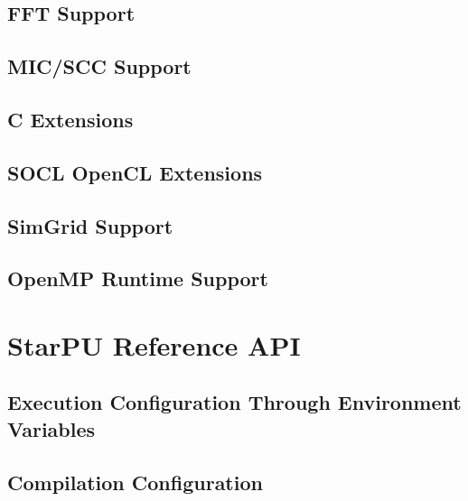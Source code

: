 \chapter{FFT Support}
\label{FFTSupport}
\hypertarget{FFTSupport}{}


\chapter{MIC/SCC Support}
\label{MICSCCSupport}
\hypertarget{MICSCCSupport}{}


\chapter{C Extensions}
\label{cExtensions}
\hypertarget{cExtensions}{}


\chapter{SOCL OpenCL Extensions}
\label{SOCLOpenclExtensions}
\hypertarget{SOCLOpenclExtensions}{}


\chapter{SimGrid Support}
\label{SimGridSupport}
\hypertarget{SimGridSupport}{}


\chapter{OpenMP Runtime Support}
\label{OpenMPRuntimeSupport}
\hypertarget{OpenMPRuntimeSupport}{}


\part{StarPU Reference API}

\chapter{Execution Configuration Through Environment Variables}
\label{ExecutionConfigurationThroughEnvironmentVariables}
\hypertarget{ExecutionConfigurationThroughEnvironmentVariables}{}


\chapter{Compilation Configuration}
\label{CompilationConfiguration}
\hypertarget{CompilationConfiguration}{}


